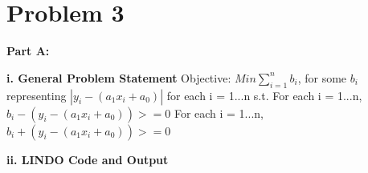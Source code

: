 \documentclass[paper=a4, fontsize=11pt]{scrartcl} %
\numberwithin{equation}{section} %
\numberwithin{figure}{section} %
\numberwithin{table}{section} %
\begin{document}
\section{Problem 3}
\textbf{Part A:}

    \textbf{i. General Problem Statement}\newline
	Objective:\newline    
    $Min \sum_{i=1}^{n}{b_i}$, for some $b_i$ representing $|y_i - (a_1x_i + a_0)|$ for each i = 1...n\newline
    s.t.\newline
    For each i = 1...n, $b_i - (y_i - (a_1x_i + a_0)) >= 0$\newline
    For each i = 1...n, $b_i + (y_i - (a_1x_i + a_0)) >= 0$\newline
    
    \textbf{ii. LINDO Code and Output}\newline
\end{document}
